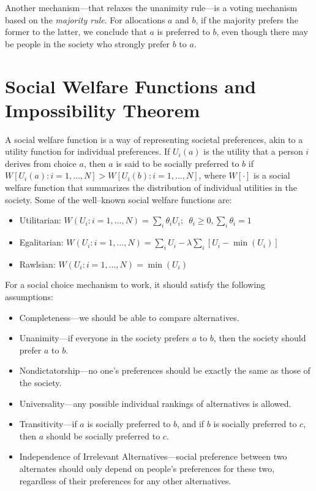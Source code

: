 \documentclass[
]{book}
\providecommand{\tightlist}{%
  \setlength{\itemsep}{0pt}\setlength{\parskip}{0pt}}
\begin{document}
Another mechanism---that relaxes the unanimity rule---is a voting mechanism based on the \emph{majority rule}. For allocations \(a\) and \(b\), if the majority prefers the former to the latter, we conclude that \(a\) is preferred to \(b\), even though there may be people in the society who strongly prefer \(b\) to \(a\).

\hypertarget{social-welfare-functions-and-impossibility-theorem}{%
\section{Social Welfare Functions and Impossibility Theorem}\label{social-welfare-functions-and-impossibility-theorem}}

A social welfare function is a way of representing societal preferences, akin to a utility function for individual preferences. If \(U_i(a)\) is the utility that a person \(i\) derives from choice \(a\), then \(a\) is said to be socially preferred to \(b\) if \(W[U_i(a):i=1,\ldots,N] > W[U_i(b):i=1,\ldots,N]\), where \(W[\cdot]\) is a social welfare function that summarizes the distribution of individual utilities in the society. Some of the well--known social welfare functions are:

\begin{itemize}
\tightlist
\item
  Utilitarian: \(W(U_i:i=1,\ldots,N) = \sum_i \theta_i U_i;\;~ \theta_i \ge 0, \sum_i\theta_i=1\)
\item
  Egalitarian: \(W(U_i:i=1,\ldots,N) = \sum_i U_i-\lambda\sum_i[U_i-\min(U_i)]\)
\item
  Rawlsian: \(W(U_i:i=1,\ldots,N) = \min(U_i)\)
\end{itemize}

For a social choice mechanism to work, it should satisfy the following assumptions:

\begin{itemize}
\tightlist
\item
  Completeness---we should be able to compare alternatives.
\item
  Unanimity---if everyone in the society prefers \(a\) to \(b\), then the society should prefer \(a\) to \(b\).
\item
  Nondictatorship---no one's preferences should be exactly the same as those of the society.
\item
  Universality---any possible individual rankings of alternatives is allowed.
\item
  Transitivity---if \(a\) is socially preferred to \(b\), and if \(b\) is socially preferred to \(c\), then \(a\) should be socially preferred to \(c\).
\item
  Independence of Irrelevant Alternatives---social preference between two alternates should only depend on people's preferences for these two, regardless of their preferences for any other alternatives.
\end{itemize}
\end{document}

